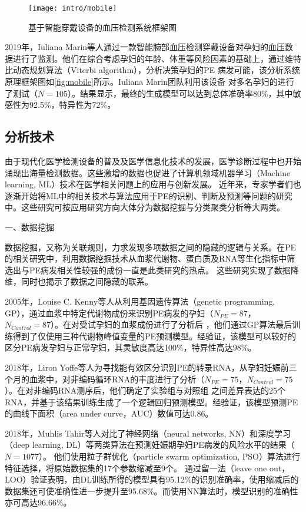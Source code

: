 \begin{figure}[htbp]
    \centering
    \texttt{[image: intro/mobile]}
    \caption[基于智能穿戴设备的血压检测系统框架图]{\label{fig:mobile}基于智能穿戴设备的血压检测系统框架图\cite{Marin2019,Marin2020}}
\end{figure}

2019年，Iuliana Marin等人\cite{Marin2019,Marin2020}通过一款智能腕部血压检测穿戴设备对孕妇的血压数据进行了监测。他们在综合考虑孕妇的年龄、体重等风险因素的基础上，通过维特比动态规划算法（Viterbi algorithm），分析决策孕妇的PE
病发可能，该分析系统原理框架图如\autoref{fig:mobile}所示。Iuliana Marin团队利用该设备
对多名孕妇的进行了测试（$N=105$）。结果显示，最终的生成模型可以达到总体准确率80\%，其中敏感性为92.5\%，特异性为72\%\cite{Marin2019}。

\subsection{分析技术}
由于现代化医学检测设备的普及及医学信息化技术的发展，医学诊断过程中也开始涌现出海量检测数据。这些激增的数据也促进了计算机领域机器学习（Machine learning, ML）技术在医学相关问题上的应用与创新发展。
近年来，专家学者们也逐渐开始将ML中的相关技术与算法应用于PE的识别、判断及预测等问题的研究中。这些研究可按应用研究方向大体分为数据挖掘与分类聚类分析等大两类\cite{Mehta2016}。

一、数据挖掘

数据挖掘，又称为关联规则，力求发现多项数据之间的隐藏的逻辑与关系\cite{Han2006}。在PE的相关研究中，利用数据挖掘技术从血浆代谢物、蛋白质及RNA等生化指标中筛选出与PE病发相关性较强的成份一直是此类研究的热点。
这些研究实现了数据降维，同时也揭示了数据之间隐藏的联系。

2005年，Louise C. Kenny等人\cite{Kenny2005}从利用基因遗传算法（genetic programming, GP），通过血浆中特定代谢物成份来识别PE病发的孕妇（$N_{PE}=87$，$N_{Control}=87$）。在对受试孕妇的血浆成份进行了分析后
，他们通过GP算法最后训练得到了仅使用三种代谢物峰值变量的PE预测模型。经验证，该模型可以较好的区分PE病发孕妇与正常孕妇，其灵敏度高达100\%，特异性高达98\%。

2018年，Liron Yoffe等人\cite{Yoffe2018}为寻找能有效区分识别PE的转录RNA，从孕妇妊娠前三个月的血浆中，对非编码循环RNA的丰度进行了分析（$N_{PE}=75$，$N_{Control}=75$）。在对非编码RNA测序后，他们确定了实验组与对照组
之间差异表达的25个RNA，并基于该结果训练生成了一个逻辑回归预测模型。经验证，该模型预测PE的曲线下面积（area under curve，AUC）数值可达0.86。

2018年，Muhlis Tahir等人\cite{Tahir2018,Tahir2018-2}对比了神经网络（neural networks, NN）和深度学习（deep learning, DL）等两类算法在预测妊娠期孕妇PE病发的风险水平的结果（$N=1077$）。
他们使用粒子群优化（particle swarm optimization, PSO）算法进行特征选择，将原始数据集的17个参数缩减至9个。
通过留一法（leave one out，LOO）验证表明，由DL训练所得的模型具有95.12\%的识别准确率，使用缩减后的数据集还可使准确性进一步提升至95.68\%。而使用NN算法时，模型识别的准确性亦可高达96.66\%。

